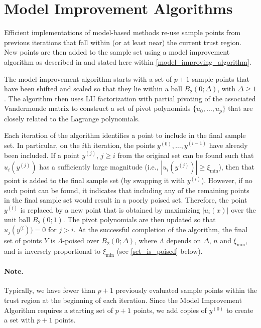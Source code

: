 \section{Model Improvement Algorithms}

\label{model_improvement_algorithms}
Efficient implementations of model-based methods re-use sample points from previous iterations that fall within (or at least near) the current trust region.
New points are then added to the sample set using a model improvement algorithm as described in 
\cite{introduction_book} and stated here within \cref{model_improving_algorithm}.

The model improvement algorithm starts with a set of $p+1$ sample points that have been shifted and scaled so that they lie within a ball $B_2(0;\Delta)$, with $\Delta \ge 1$.   
The algorithm then uses LU factorization with partial pivoting of the 
associated Vandermonde matrix to construct a set of pivot polynomials $\{u_0, \ldots, u_p\}$ that are closely related to the Lagrange polynomials. 


Each iteration of the algorithm identifies a point to include in the final sample set.
In particular, on the $i$th iteration, the points $y^{(0)}, \ldots, y^{(i-1)}$ have already been included.   
If a point $y^{(j)}$,  $j \ge i$ from the original set can be found such that 
$u_i(y^{(j)})$ has a sufficiently large magnitude  (i.e.,  $|u_i(y^{(j)})| \ge \xi_{\min}$),  
then that point is added to the final sample set (by swapping it with $y^{(i)}$).
However, if no such point can be found, 
it indicates that including any of the remaining points in the final sample set would result in a poorly poised set.
Therefore, the point $y^{(i)}$ is replaced by a new point that is obtained by maximizing $|u_i(x)|$ 
over the unit ball $B_2(0;1)$.
The pivot polynomials are then updated so that 
$u_j(y^{(i})) = 0$ for $j > i$.
At the successful completion of the algorithm, the final set of points $Y$ is $\Lambda$-poised over $B_2(0;\Delta)$,
where $\Lambda$ depends on $\Delta$,  $n$ and $\xi_{\min}$,  and is inversely proportional to $\xi_{\min}$
(see \cref{set_is_poised} below).

\paragraph*{Note.}
Typically,  we have fewer than $p+1$ previously evaluated sample points within the trust region at the beginning of each iteration.
Since the Model Improvement Algorithm requires a starting set of $p+1$ points, 
we add copies of $y^{(0)}$ to create a set with $p+1$ points.

